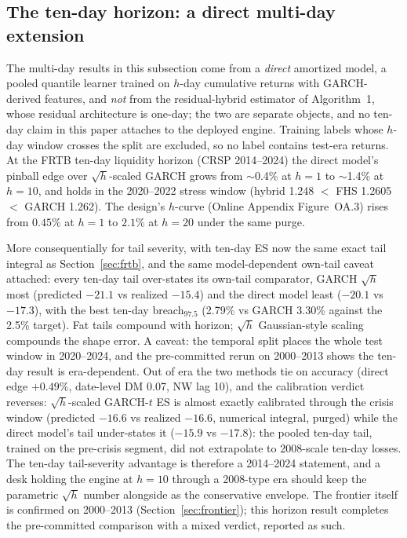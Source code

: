 \documentclass[11pt]{article}
\theoremstyle{remark}
\begin{document}
\subsection{The ten-day horizon: a direct multi-day extension}

The multi-day results in this subsection come from a \emph{direct} amortized model, a pooled quantile learner trained on $h$-day
cumulative returns with GARCH-derived features, and \emph{not} from the residual-hybrid estimator of Algorithm~1, whose residual
architecture is one-day; the two are separate objects, and no
ten-day claim in this paper attaches to the deployed engine. Training
labels whose $h$-day window crosses the split are excluded, so no
label contains test-era returns. At the FRTB ten-day
liquidity horizon (CRSP 2014--2024) the direct model's pinball edge
over $\sqrt{h}$-scaled GARCH grows
from $\sim$0.4\% at $h=1$ to $\sim$1.4\% at $h=10$, and holds in the
2020--2022 stress window (hybrid 1.248 $<$ FHS 1.2605 $<$ GARCH 1.262).
The design's $h$-curve (Online Appendix Figure~OA.3) rises from
$0.45\%$ at $h{=}1$ to $2.1\%$ at $h{=}20$ under the same purge.

More consequentially for tail severity, with ten-day ES now the same exact tail integral as Section~\ref{sec:frtb}, and the same
model-dependent own-tail caveat attached: every ten-day tail
over-states its own-tail comparator, GARCH $\sqrt{h}$ most (predicted
$-21.1$ vs realized $-15.4$) and the direct model least
($-20.1$ vs $-17.3$), with the best ten-day breach$_{97.5}$ (2.79\%
vs GARCH 3.30\% against the 2.5\% target). Fat
tails compound with horizon; $\sqrt{h}$ Gaussian-style scaling
compounds the shape error. A caveat: the temporal split places the whole
test window in 2020--2024, and the pre-committed rerun on 2000--2013 shows
the ten-day result is era-dependent. Out of era the two methods tie on
accuracy (direct edge $+0.49\%$, date-level DM 0.07, NW lag 10), and
the calibration verdict reverses: $\sqrt{h}$-scaled GARCH-$t$ ES is
almost exactly calibrated through the crisis window (predicted
$-16.6$ vs realized $-16.6$, numerical integral, purged) while the
direct model's tail under-states it ($-15.9$ vs $-17.8$): the pooled ten-day tail,
trained on the pre-crisis segment, did not extrapolate to 2008-scale
ten-day losses. The ten-day tail-severity advantage
is therefore a 2014--2024 statement,
and a desk holding the engine at $h=10$ through a 2008-type era should
keep the parametric $\sqrt{h}$ number alongside as the conservative
envelope. The frontier itself is confirmed on 2000--2013
(Section~\ref{sec:frontier}); this horizon result completes the
pre-committed comparison with a mixed verdict, reported as such.
\end{document}
